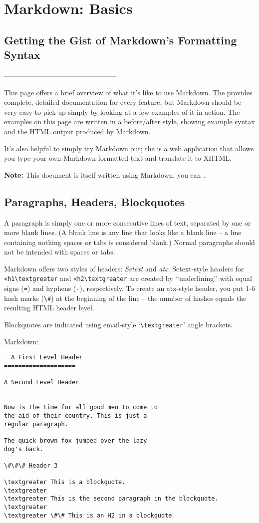 \chapter{Markdown: Basics}

\section{Getting the Gist of Markdown's Formatting Syntax}
------------------------------------------------

This page offers a brief overview of what it's like to use Markdown. The  provides complete, detailed documentation for every feature, but Markdown should be very easy to pick up simply by looking at a few examples of it in action. The examples on this page are written in a before/after style, showing example syntax and the HTML output produced by Markdown.

It's also helpful to simply try Markdown out; the  is a web application that allows you type your own Markdown-formatted text and translate it to XHTML.

\textbf{Note:} This document is itself written using Markdown; you can .

\section{Paragraphs, Headers, Blockquotes}

A paragraph is simply one or more consecutive lines of text, separated by one or more blank lines. (A blank line is any line that looks like a blank line -- a line containing nothing spaces or tabs is considered blank.) Normal paragraphs should not be intended with spaces or tabs.

Markdown offers two styles of headers: \emph{Setext} and \emph{atx}. Setext-style headers for \lstinline{<h1\textgreater} and \lstinline{<h2\textgreater} are created by ‘‘underlining’’ with equal signs (\lstinline{=}) and hyphens (\lstinline{-}), respectively. To create an atx-style header, you put 1-6 hash marks (\lstinline{\#}) at the beginning of the line -- the number of hashes equals the resulting HTML header level.

Blockquotes are indicated using email-style ‘\lstinline{\textgreater}’ angle brackets.

Markdown:
\begin{verbatim}
  A First Level Header
====================

A Second Level Header
---------------------

Now is the time for all good men to come to
the aid of their country. This is just a
regular paragraph.

The quick brown fox jumped over the lazy
dog's back.

\#\#\# Header 3

\textgreater This is a blockquote.
\textgreater 
\textgreater This is the second paragraph in the blockquote.
\textgreater
\textgreater \#\# This is an H2 in a blockquote
\end{verbatim}

